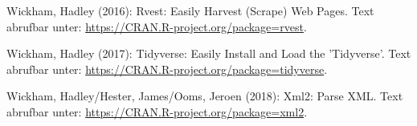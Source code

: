 \documentclass[oneside, 12pt]{scrbook}
\theoremstyle{definition}
\theoremstyle{definition}
\theoremstyle{definition}
\theoremstyle{remark}
\begin{document}
\leavevmode\hypertarget{ref-wickham_2016}{}%
Wickham, Hadley (2016): Rvest: Easily Harvest (Scrape) Web Pages. Text
abrufbar unter: \url{https://CRAN.R-project.org/package=rvest}.

\leavevmode\hypertarget{ref-wickham_2017}{}%
Wickham, Hadley (2017): Tidyverse: Easily Install and Load the
'Tidyverse'. Text abrufbar unter:
\url{https://CRAN.R-project.org/package=tidyverse}.

\leavevmode\hypertarget{ref-wickham_2018}{}%
Wickham, Hadley/Hester, James/Ooms, Jeroen (2018): Xml2: Parse XML. Text
abrufbar unter: \url{https://CRAN.R-project.org/package=xml2}.
\end{document}
